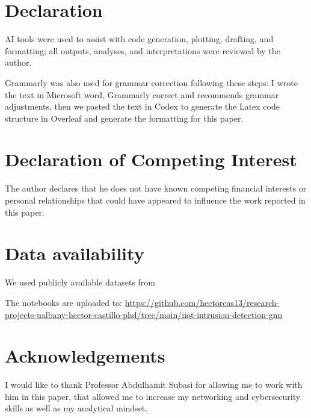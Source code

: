 \documentclass[final,5p,times,twocolumn]{elsarticle}
\begin{document}

\section*{Declaration}
AI tools were used to assist with code generation, plotting, drafting, and formatting; all outputs, analyses, and interpretations were reviewed by the author.

Grammarly was also used for grammar correction following these steps: I wrote the text in Microsoft word, Grammarly correct and recommends grammar adjustments, then we pasted the text in Codex to generate the Latex code structure in Overleaf and generate the formatting for this paper.

\section*{Declaration of Competing Interest}
The author declares that he does not have known competing financial interests or personal relationships that could have appeared to influence the work reported in this paper.

\section*{Data availability}
We used publicly available datasets from \citep{unb_iiot_2025}

The notebooks are uploaded to: \url{https://github.com/hectorcas13/research-projects-ualbany-hector-castillo-phd/tree/main/iiot-intrusion-detection-gnn}

\section*{Acknowledgements}
I would like to thank Professor Abdulhamit Subasi for allowing me to work with him in this paper, that allowed me to increase my networking and cybersecurity skills as well as my analytical mindset.
 

\end{document}
